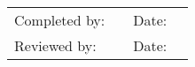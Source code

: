 \vfill

\noindent\begin{tabularx}{\textwidth}{@{}lXlX@{}}
Completed by: & \hrulefill & Date: & \hrulefill \\
[2ex]
Reviewed by: & \hrulefill & Date: & \hrulefill \\
\end{tabularx}
